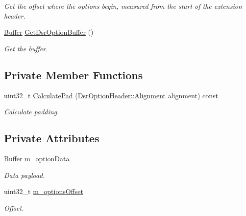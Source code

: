 \begin{DoxyCompactItemize}
\begin{DoxyCompactList}\small\item\em Get the offset where the options begin, measured from the start of the extension header. \end{DoxyCompactList}\item 
\hyperlink{classns3_1_1Buffer}{Buffer} \hyperlink{classns3_1_1dsr_1_1DsrOptionField_a6f835e18ae5fdb505ffb858a74c08248}{Get\+Dsr\+Option\+Buffer} ()
\begin{DoxyCompactList}\small\item\em Get the buffer. \end{DoxyCompactList}\end{DoxyCompactItemize}
\subsection*{Private Member Functions}
\begin{DoxyCompactItemize}
\item 
uint32\+\_\+t \hyperlink{classns3_1_1dsr_1_1DsrOptionField_a83b979a52f0e70889f34e58ea5398433}{Calculate\+Pad} (\hyperlink{structns3_1_1dsr_1_1DsrOptionHeader_1_1Alignment}{Dsr\+Option\+Header\+::\+Alignment} alignment) const 
\begin{DoxyCompactList}\small\item\em Calculate padding. \end{DoxyCompactList}\end{DoxyCompactItemize}
\subsection*{Private Attributes}
\begin{DoxyCompactItemize}
\item 
\hyperlink{classns3_1_1Buffer}{Buffer} \hyperlink{classns3_1_1dsr_1_1DsrOptionField_a5394f79d96673471bcf222ed47beb26d}{m\+\_\+option\+Data}
\begin{DoxyCompactList}\small\item\em Data payload. \end{DoxyCompactList}\item 
uint32\+\_\+t \hyperlink{classns3_1_1dsr_1_1DsrOptionField_a88460b666473d17276c6b157d02b0031}{m\+\_\+options\+Offset}
\begin{DoxyCompactList}\small\item\em Offset. \end{DoxyCompactList}\end{DoxyCompactItemize}


